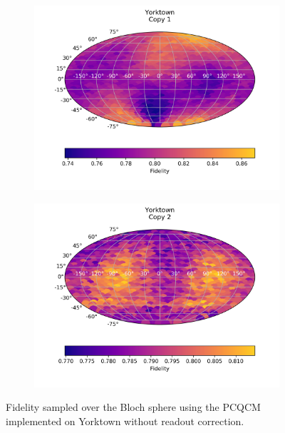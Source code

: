   \begin{figure}[H]
    \centering
    \begin{subfigure}{.5\textwidth}
      \centering
      \includegraphics[width=\textwidth]{Figures/PhaseCovariant/IBM/FullSphere/results_ibmqx2_copy1.png}
      
      \label{fig:pc_uncorrected_yorktown_sphere_1}
    \end{subfigure}%
    \begin{subfigure}{.5\textwidth}
      \centering
      \includegraphics[width=\textwidth]{Figures/PhaseCovariant/IBM/FullSphere/results_ibmqx2_copy2.png}
      
      \label{fig:pc_uncorrected_yorktown_sphere_2}
    \end{subfigure}
    \caption{Fidelity sampled over the Bloch sphere using the PCQCM implemented on Yorktown without readout correction.}
    \label{fig:pc_uncorrected_yorktown_sphere}
  \end{figure}
  
